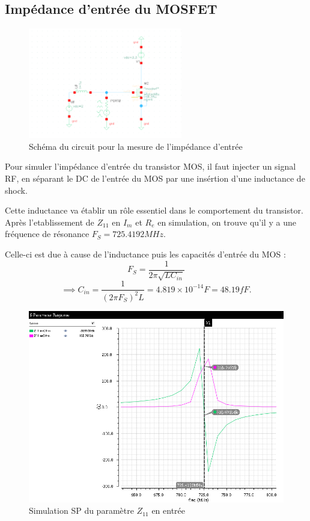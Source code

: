 \documentclass[a4paper]{article}
\begin{document}
\clearpage

\subsection{Imp\'edance d'entr\'ee du MOSFET}

\begin{figure}[!htb]
\begin{center}
  \includegraphics[width=0.6\textwidth]{arch-transistor-input-impedance.png}
  \caption{Sch\'ema du circuit pour la mesure de l'imp\'edance d'entr\'ee}
\end{center}
\end{figure}

Pour simuler l'imp\'edance d'entr\'ee du transistor MOS, il faut injecter
un signal RF, en s\'eparant le DC de l'entr\'ee du MOS par une ins\'ertion
d'une inductance de shock.

Cette inductance va \'etablir un r\^ole essentiel dans le comportement
du transistor. Apr\`es l'etablissement de $Z_{11}$ en $I_{m}$ et $R_{e}$
en simulation, on trouve qu'il y a une fr\'equence de r\'esonance
$F_S = 725.4192 MHz$.

Celle-ci est due \`a cause de l'inductance puis les capacit\'es d'entr\'ee
du MOS :
\[
  F_S = \frac{1}{2\pi \sqrt{LC_{in}}}
\]
\[
  \implies C_{in} = \frac{1}{(2\pi F_S)^2 L} = 4.819 \times 10^{-14} F = 48.19 fF.
\]

\begin{figure}[!htb]
\begin{center}
  \includegraphics[scale=0.47]{sim-input-impedance.png}
  \caption{Simulation SP du param\`etre $Z_{11}$ en entr\'ee}
\end{center}
\end{figure}
\end{document}
